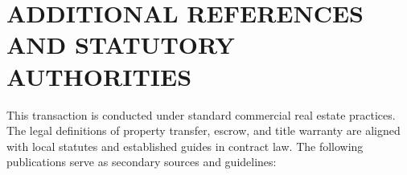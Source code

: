 \section{ADDITIONAL REFERENCES AND STATUTORY AUTHORITIES}
This transaction is conducted under standard commercial real estate practices. The legal definitions of property transfer, escrow, and title warranty are aligned with local statutes and established guides in contract law. The following publications serve as secondary sources and guidelines:

\nocite{*}
